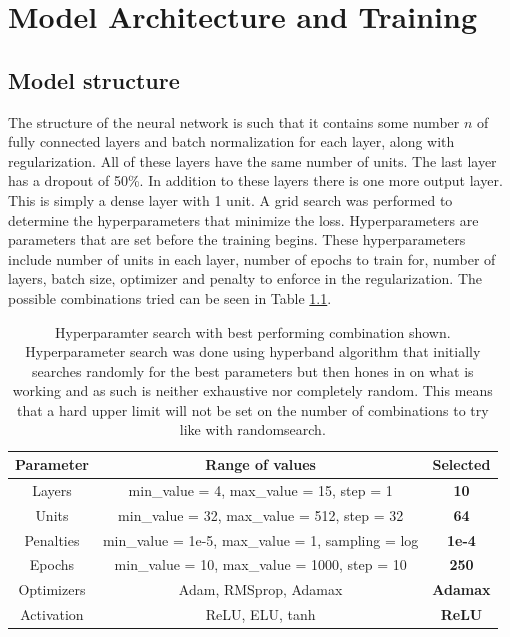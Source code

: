 
\chapter{Model Architecture and Training}

\label{Chapter3}

\section{Model structure}
The structure of the neural network is such that it contains some number $n$ of fully connected layers and batch normalization for each layer, along with regularization. All of these layers have the same number of units. The last layer has a dropout of 50\%. In addition to these layers there is one more output layer. This is simply a dense layer with 1 unit. A grid search was performed to determine the hyperparameters that minimize the loss. Hyperparameters are parameters that are set before the training begins\cite{hyperparameters_definition}. These hyperparameters include number of units in each layer, number of epochs to train for, number of layers, batch size, optimizer and penalty to enforce in the regularization. The possible combinations tried can be seen in Table \ref{table:gridSearchHyperparamters}.

\begin{table}[h]
    \centering
    \caption[Hyperparameter search with best performing combination.]{Hyperparamter search with best performing combination shown. Hyperparameter search was done using hyperband algorithm that initially searches randomly for the best parameters but then hones in on what is working and as such is neither exhaustive nor completely random. This means that a hard upper limit will not be set on the number of combinations to try like with randomsearch.}
    \label{table:gridSearchHyperparamters}
    \begin{tabular}{ccc}
        \toprule
        Parameter & Range of values & Selected\\
        \midrule
        Layers &  min\_value = 4, max\_value = 15, step = 1 & \textbf{10}\\
        Units &  min\_value = 32, max\_value = 512, step = 32 & \textbf{64}\\
        Penalties & min\_value = 1e-5, max\_value = 1, sampling = log & \textbf{1e-4}\\
        Epochs & min\_value = 10, max\_value = 1000, step = 10 & \textbf{250}\\
        Optimizers & Adam, RMSprop, Adamax & \textbf{Adamax}\\
        Activation & ReLU, ELU, tanh & \textbf{ReLU}\\
        \bottomrule
    \end{tabular}
\end{table}

